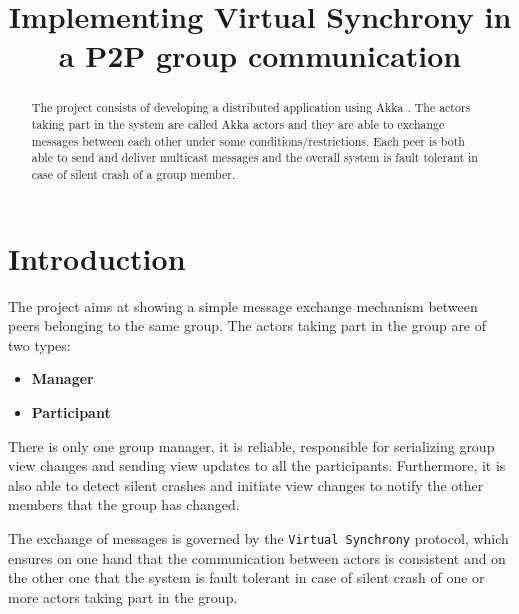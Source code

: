 \documentclass[conference]{IEEEtran}
\begin{document}
\title{Implementing Virtual Synchrony in a P2P group communication}

\author{
}

\maketitle

\begin{abstract}
The project consists of developing a distributed application using Akka \cite{Akka}. The actors
taking part in the system are called Akka actors and they are able
to exchange messages between each other under some conditions/restrictions.
Each peer is both able to send and deliver multicast messages and 
the overall system is fault tolerant in case of silent crash of
a group member.   

\end{abstract}

\section{Introduction}
\label{sec:introduction}
The project aims at showing a simple message exchange mechanism between
peers belonging to the same group. The actors taking part in the group
are of two types:
\begin{itemize}
	\item \textbf{Manager}
	\item \textbf{Participant}
\end{itemize} 
There is only one group manager, it is reliable, responsible for serializing group view
changes and sending view updates to all the participants. Furthermore, it is also able to detect silent crashes and initiate view changes to notify the other members that the group has changed.

The exchange of messages is governed by the \texttt{Virtual Synchrony} protocol, which ensures on one hand that the communication between actors is consistent and on the other one that the system is fault tolerant in case of silent crash of one or more actors taking part in the group.
\end{document}
